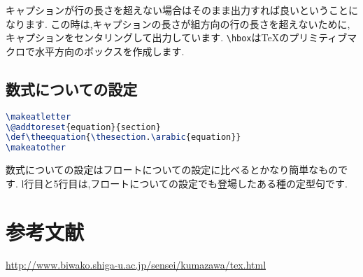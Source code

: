 キャプションが行の長さを超えない場合はそのまま出力すれば良いということになります.
この時は,キャプションの長さが組方向の行の長さを超えないために,キャプションをセンタリングして出力しています.
\verb|\hbox|は{\TeX}のプリミティブマクロで水平方向のボックスを作成します.

\subsection{数式についての設定}

\begin{lstlisting}[caption = 数式まわりの設定, label = list:eq, language = tex]
\makeatletter
\@addtoreset{equation}{section}
\def\theequation{\thesection.\arabic{equation}}
\makeatother
\end{lstlisting}

数式についての設定はフロートについての設定に比べるとかなり簡単なものです.
l行目と5行目は,フロートについての設定でも登場したある種の定型句です.

\section*{参考文献}
\url{http://www.biwako.shiga-u.ac.jp/sensei/kumazawa/tex.html}

